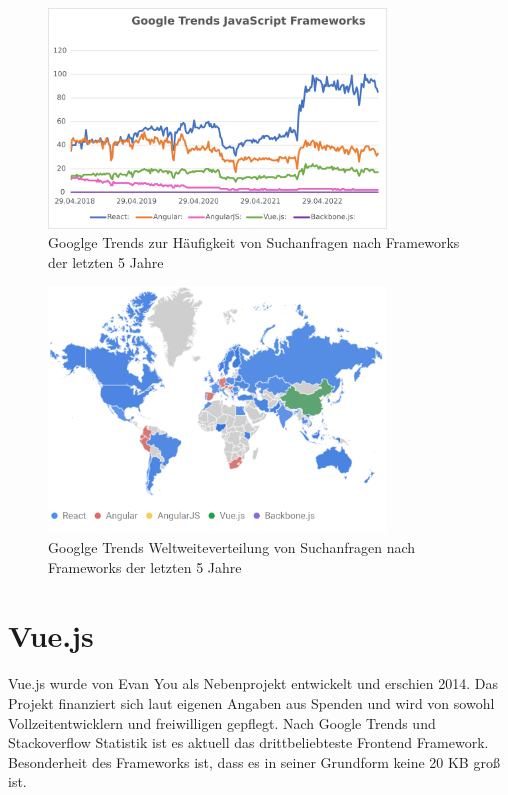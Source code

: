 \begin{figure}[!htb]
    \centering
    \includegraphics[width=0.8\textwidth]{img/Google Stats/google_frameworks_trends}
    \caption{Googlge Trends zur Häufigkeit von Suchanfragen nach Frameworks der letzten 5 Jahre \cite{googleTrends}}
    \label{fig:google_trends}
\end{figure}

\begin{figure}[!htb]
    \centering
    \includegraphics[width=0.8\textwidth]{img/Google Stats/2023-04-26 12_20_26-React, Angular, AngularJS, Vue.js, Backbone.js - Erkunden - Google Trends}
    \caption{Googlge Trends Weltweiteverteilung von Suchanfragen nach Frameworks der letzten 5 Jahre \cite{googleTrends}}
    \label{fig:google_trends_world}
\end{figure}


\section{Vue.js}
Vue.js wurde von Evan You als Nebenprojekt entwickelt und erschien 2014.
Das Projekt finanziert sich laut eigenen Angaben aus Spenden und
wird von sowohl Vollzeitentwicklern und freiwilligen gepflegt. \cite{vueFAQ}
Nach Google Trends und Stackoverflow Statistik ist es aktuell das drittbeliebteste
Frontend Framework. \cite{googleTrends} \cite{stackoverflowStats}
Besonderheit des Frameworks ist, dass es in seiner Grundform keine 20 KB groß ist. \cite[S. 523]{bin2019}



